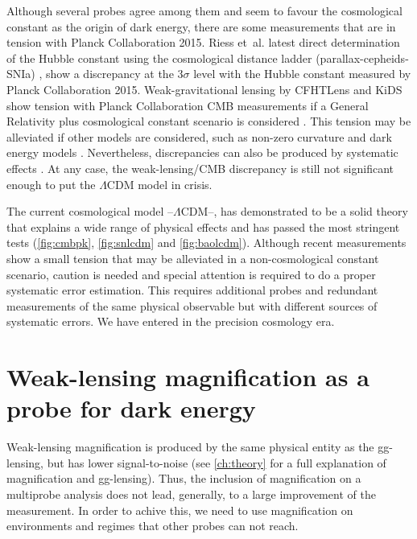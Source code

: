 Although several probes agree among them and seem to favour the cosmological constant as the origin of dark energy, there are some measurements that are in tension with Planck Collaboration 2015. Riess et~al. latest direct determination of the Hubble constant using the cosmological distance ladder (parallax-cepheids-SNIa) \cite{2016ApJ...826...56R}, show a discrepancy at the $3\sigma$ level with the Hubble constant measured by Planck Collaboration 2015. Weak-gravitational lensing  by CFHTLens and KiDS show tension with Planck Collaboration CMB measurements if a General Relativity plus cosmological constant scenario is considered \cite{2013MNRAS.430.2200K,2017arXiv170303383H,2017MNRAS.467.3024L}. This tension may be alleviated if other models are considered, such as non-zero curvature and dark energy models \cite{2016arXiv161004606J,2017arXiv170400762D,2017arXiv170108165Z}. Nevertheless, discrepancies can also be produced by systematic effects \cite{2015PhRvD..92b3003D,2017MNRAS.465.2033J}. At any case, the weak-lensing/CMB discrepancy is still not significant enough to put the $\Lambda$CDM model in crisis.
\newline

The current cosmological model --$\Lambda$CDM--, has demonstrated to be a solid theory that explains a wide range of physical effects and has passed the most stringent tests (\autoref{fig:cmbpk}, \autoref{fig:snlcdm} and \autoref{fig:baolcdm}). Although recent measurements show a small tension that may be alleviated in a  non-cosmological constant scenario, caution is needed and special attention is required to do a proper systematic error estimation. This requires additional probes and redundant measurements of the same physical observable but with different sources of systematic errors. We have entered in the precision cosmology era.

\section{Weak-lensing magnification as a probe for dark energy}
Weak-lensing magnification is produced by the same physical entity as the gg-lensing, but has lower signal-to-noise (see \autoref{ch:theory} for a full explanation of magnification and gg-lensing). Thus, the inclusion of magnification on a multiprobe analysis does not lead, generally, to a large improvement of the measurement. In order to achive this, we need to use magnification on environments and regimes that other probes can not reach. 
\newline

